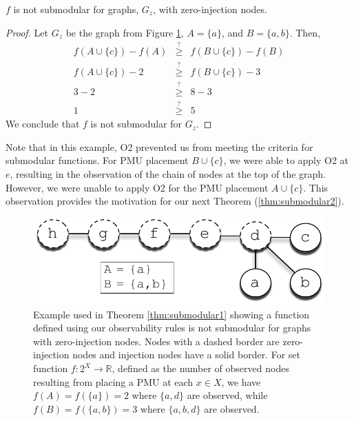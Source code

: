 \begin{theorem}
\label{thm:submodular1}
$f$ is not submodular for graphs, $G_z$, with zero-injection nodes.
\end{theorem}

\begin{proof}
Let $G_z$ be the graph from Figure \ref{fig:submodular-counter}, $A=\{a\}$, and $B=\{a,b\}$. Then, %
\begin{eqnarray*}
f(A \cup \{c\}) - f(A) &\stackrel{?}{\geq}& f(B \cup \{c\}) - f(B) \\
f(A \cup \{c\}) - 2 &\stackrel{?}{\geq}& f(B \cup \{c\}) - 3 \\
3-2 &\stackrel{?}{\geq}& 8 - 3 \\
1 &\stackrel{?}{\geq}& 5
\end{eqnarray*}
We conclude that $f$ is not submodular for $G_z$. %
\end{proof}

Note that in this example, O2 prevented us from meeting the criteria for submodular functions.  For PMU placement $B \cup \{c\}$, we were able to apply O2 at $e$, resulting in the observation of the
chain of nodes at the top of the graph.  However, we were unable to apply O2 for the PMU placement $A \cup \{c\}$.  This observation provides the motivation for our next Theorem (\ref{thm:submodular2}).
  

\begin{figure}[t]
\centering
\includegraphics[scale=.75]{figs/submodular-counterexample.pdf}
\caption{Example used in Theorem \ref{thm:submodular1} showing a function defined using our observability rules is not submodular for graphs with zero-injection nodes.  
Nodes with a dashed border are zero-injection nodes and injection nodes have a solid border. For set function $f: 2^X \rightarrow \mathbb{R}$, defined as the number of observed nodes 
resulting from placing a PMU at each $x \in X$, we have $f(A) = f(\{a\}) = 2$ where $\{a,d\}$ are observed, while $f(B) = f(\{a,b\}) = 3$ where $\{a,b,d\}$ are observed.  }
\label{fig:submodular-counter}
\end{figure}


